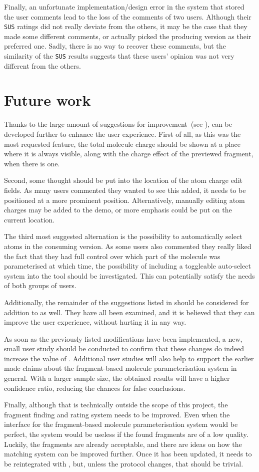 Finally, an unfortunate implementation/design error in the system that stored the user comments lead to the loss of the comments of two users. Although their \verb|SUS| ratings did not really deviate from the others, it may be the case that they made some different comments, or actually picked the producing version as their preferred one. Sadly, there is no way to recover these comments, but the similarity of the \verb|SUS| results suggests that these users' opinion was not very different from the others.



\section{Future work}
Thanks to the large amount of suggestions for improvement~(see ), \oframp{} can be developed further to enhance the user experience. First of all, as this was the most requested feature, the total molecule charge should be shown at a place where it is always visible, along with the charge effect of the previewed fragment, when there is one.

Second, some thought should be put into the location of the atom charge edit fields. As many users commented they wanted to see this added, it needs to be positioned at a more prominent position. Alternatively, manually editing atom charges may be added to the demo, or more emphasis could be put on the current location.

The third most suggested alternation is the possibility to automatically select atoms in the consuming version. As some users also commented they really liked the fact that they had full control over which part of the molecule was parameterised at which time, the possibility of including a toggleable auto-select system into the tool should be investigated. This can potentially satisfy the needs of both groups of users.

Additionally, the remainder of the suggestions listed in  should be considered for addition to \oframp{} as well. They have all been examined, and it is believed that they can improve the user experience, without hurting it in any way.

As soon as the previously listed modifications have been implemented, a new, small user study should be conducted to confirm that these changes do indeed increase the value of \oframp. Additional user studies will also help to support the earlier made claims about the fragment-based molecule parameterisation system in general. With a larger sample size, the obtained results will have a higher confidence ratio, reducing the chances for false conclusions.

Finally, although that is technically outside the scope of this project, the fragment finding and rating system needs to be improved. Even when the interface for the fragment-based molecule parameterisation system would be perfect, the system would be useless if the found fragments are of a low quality. Luckily, the fragments are already acceptable, and there are ideas on how the matching system can be improved further. Once it has been updated, it needs to be reintegrated with \oframp, but, unless the protocol changes, that should be trivial.
